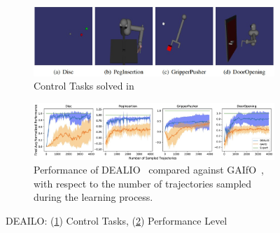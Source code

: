 \begin{figure}[t]
    \centering
    \begin{subfigure}[b]{0.8\textwidth}
        \centering
        \includegraphics[width=\textwidth]{Figures/images/dealio/dealio_performed_task.jpg}
        \caption{Control Tasks solved in~\cite{torabi2021dealio}}
        \label{fig:dealio_task}
    \end{subfigure}
    \vfill
    \begin{subfigure}[b]{0.8\textwidth}
        \includegraphics[width=\textwidth]{Figures/images/dealio/dealio_performance.jpg}
        \caption{Performance of DEALIO~\cite{torabi2021dealio} compared against GAIfO~\cite{torabi2018gaifo}, with respect to the number of trajectories sampled during the learning process.}
        \label{fig:dealio_performance}
    \end{subfigure}
    \caption{DEAILO: (\ref{fig:dealio_task}) Control Tasks, (\ref{fig:dealio_performance}) Performance Level}
    \label{fig:dealio}
\end{figure}

